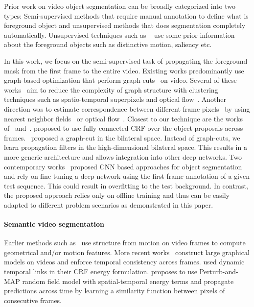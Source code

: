 \documentclass[10pt,twocolumn,letterpaper]{article}
\begin{document}
Prior work on video object segmentation can be broadly categorized into two types:
Semi-supervised methods that require manual annotation to define what is foreground
object and unsupervised methods that does segmentation completely automatically.
Unsupervised techniques such as
~\cite{faktor2014video,li2013video,lee2011key,papazoglou2013fast,wang2015saliency,
zhang2013video,taylor2015causal,dondera2014interactive}
use some prior information about the foreground objects such as
distinctive motion, saliency etc.


In this work, we focus on the semi-supervised task of propagating the foreground
mask from the first frame to the entire video. Existing works
predominantly use graph-based optimization that perform graph-cuts~\cite{boykov2001fast,
boykov2001interactive,shi2000normalized} on video.
Several of these works~\cite{reso2014interactive,
li2005video,price2009livecut,wang2005interactive,kohli2007dynamic,jain2014supervoxel}
aim to reduce the complexity of graph structure with
clustering techniques such as spatio-temporal superpixels and
optical flow~\cite{tsaivideo}.
Another direction was to estimate correspondence between different frame
pixels~\cite{agarwala2004keyframe,bai2009video,lang2012practical} by using
nearest neighbor fields~\cite{fan2015jumpcut} or optical flow~\cite{chuang2002video}.
Closest to our technique are the works of~\cite{perazzi2015fully} and~\cite{marki2016bilateral}.
\cite{perazzi2015fully} proposed to use fully-connected CRF over the
object proposals across frames.~\cite{marki2016bilateral} proposed a
graph-cut in the bilateral space.
Instead of graph-cuts, we learn
propagation filters in the high-dimensional bilateral space.
This results in a more generic architecture and allows integration into other deep networks.
Two contemporary works~\cite{caelles2016one,khoreva2016learning} proposed CNN based
approaches for object segmentation and rely on fine-tuning a deep network
using the first frame annotation of a given test sequence. This could result
in overfitting to the test background.
In contrast, the proposed approach relies only on offline training and thus can be easily adapted
to different problem scenarios as demonstrated in this paper.

\vspace{-0.5cm}
\paragraph{Semantic video segmentation}
Earlier methods such as~\cite{brostow2008segmentation,sturgess2009combining} use structure from motion
on video frames to compute geometrical and/or motion features.
More recent works~\cite{ess2009segmentation,chen2011temporally,de2012line,miksik2013efficient,tripathi2015semantic,
kundu2016feature} construct large graphical models on videos and enforce temporal consistency across frames. \cite{chen2011temporally} used dynamic temporal links in their CRF energy formulation.
\cite{de2012line} proposes to use Perturb-and-MAP random field model with spatial-temporal energy terms
and \cite{miksik2013efficient} propagate predictions across time by learning
a similarity function between pixels of consecutive frames.
\end{document}
